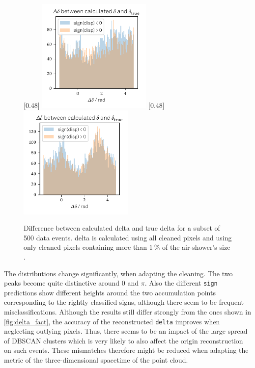 \begin{figure}
  \subcaptionbox{\label{fig:delta_diff_a}}[0.48\textwidth]{
    \includegraphics[width=0.5\textwidth]{Plots/delta_delta/delta_true_diff_hist_thresholds_rad_20131104_162.pdf}
  }
  \subcaptionbox{\label{fig:delta_diff_perc}}[0.48\textwidth]{
    \includegraphics[width=0.5\textwidth]{Plots/delta_delta/delta_delta _DBSCAN_1perc_rad_20131104_162.pdf}
  }
  \caption{Difference between calculated delta and true delta for a subset of 500 data events. delta is calculated using all cleaned pixels \protect{} and using only cleaned pixels containing more than $\SI{1}{\percent}$ of the air-shower's size \protect{}.}
  \label{fig:true_delta}
\end{figure}
%
The distributions change significantly, when adapting the cleaning.
The two peaks become quite distinctive around $0$ and $\pi$. Also the
different \texttt{sign} predictions show different heights around the two
accumulation points corresponding to the rightly classified signs, although
there seem to be frequent misclassifications. Although the results still
differ strongly from the ones shown in \autoref{fig:delta_fact}, the
accuracy of the reconstructed \texttt{delta} improves when neglecting outlying pixels. Thus, there
seems to be an impact of the large spread of DBSCAN clusters which is very
likely to also affect the origin reconstruction on such events. These mismatches
therefore might be reduced when adapting the metric of the three-dimensional
spacetime of the point cloud.

